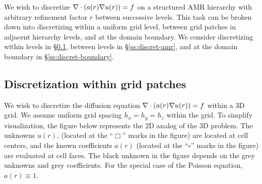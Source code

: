 \documentclass[10pt]{article}
\begin{document}
 \newcommand{\alc}{\alpha_{0}}
 \newcommand{\alxp}{\alpha_{x}}
 \newcommand{\alxm}{\alpha_{\bar{x}}}
 \newcommand{\alyp}{\alpha_{y}}
 \newcommand{\alym}{\alpha_{\bar{y}}}
 \newcommand{\alzp}{\alpha_{z}}
 \newcommand{\alzm}{\alpha_{\bar{z}}}

 \newcommand{\Uc}{U_{0}}
 \newcommand{\Uxp}{U_{x}}
 \newcommand{\Uxm}{U_{\bar{x}}}
 \newcommand{\Uyp}{U_{y}}
 \newcommand{\Uym}{U_{\bar{y}}}
 \newcommand{\Uzp}{U_{z}}
 \newcommand{\Uzm}{U_{\bar{z}}}
 \newcommand{\F}{F}

 \newcommand{\vol}{{\Omega_h}}
 \newcommand{\volel}{\textbf{V}}
 \newcommand{\surf}{\partial\vol}
 \newcommand{\surfel}{\textbf{S}}
 \newcommand{\sidexp}{\partial\Omega_h^{+x}}
 \newcommand{\sidexm}{\partial\Omega_h^{-x}}
 \newcommand{\sideyp}{\partial\Omega_h^{+y}}
 \newcommand{\sideym}{\partial\Omega_h^{-y}}
 \newcommand{\sidezp}{\partial\Omega_h^{+z}}
 \newcommand{\sidezm}{\partial\Omega_h^{-z}}

 \newcommand{\sideXP}{\partial\Omega_H^{+x}}


We wish to discretize $\nabla\cdot(a(r) \nabla u(r)) = f$
on a structured AMR hierarchy with arbitrary refinement factor $r$
between successive levels.  This task can be broken down into
discretizing within a uniform grid level, between grid patches in
adjacent hierarchy levels, and at the domain boundary.  
We consider discretizing within levels in
\S\ref{ss:discret-unigrid}, between
levels in \S\ref{ss:discret-amr}, and at the domain boundary in
\S\ref{ss:discret-boundary}.

\subsection{Discretization within grid patches} \label{ss:discret-unigrid}

We wish to discretize the diffusion equation $\nabla\cdot(a(r) \nabla
u(r)) = f$ within a $3$D grid.  We assume uniform
grid spacing $h_{x} = h_{y} = h_{z}$ within the grid.  To simplify
visualization, the figure below represents the $2$D analog of the $3$D
problem.  The unknowns $u(r)$, (located at the ``$\Box$'' marks in the
figure) are located at cell centers, and the known coefficients $a(r)$
(located at the ``$\circ$'' marks in the figure) are evaluated at cell
faces.  The black unknown in the figure depends on the grey unknowns
and grey coefficients.  For the special case of the Poisson equation,
$a(r)\equiv 1$.
\end{document}
